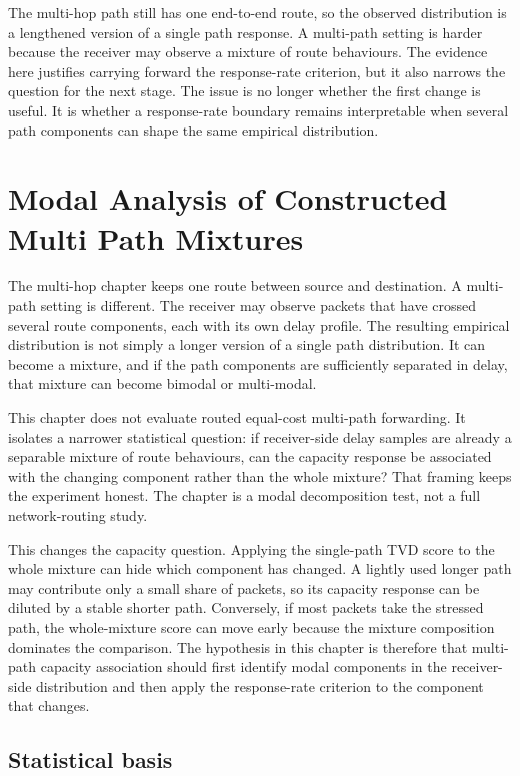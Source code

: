 \documentclass[a4paper,11pt]{report}
\begin{document}
The multi-hop path still has one end-to-end route, so the observed distribution is a lengthened version of a single path response. A multi-path setting is harder because the receiver may observe a mixture of route behaviours. The evidence here justifies carrying forward the response-rate criterion, but it also narrows the question for the next stage. The issue is no longer whether the first change is useful. It is whether a response-rate boundary remains interpretable when several path components can shape the same empirical distribution.

\chapter{Modal Analysis of Constructed Multi Path Mixtures}
\label{sec:eval-multi-path}

The multi-hop chapter keeps one route between source and destination. A multi-path setting is different. The receiver may observe packets that have crossed several route components, each with its own delay profile. The resulting empirical distribution is not simply a longer version of a single path distribution. It can become a mixture, and if the path components are sufficiently separated in delay, that mixture can become bimodal or multi-modal.

This chapter does not evaluate routed equal-cost multi-path forwarding. It isolates a narrower statistical question: if receiver-side delay samples are already a separable mixture of route behaviours, can the capacity response be associated with the changing component rather than the whole mixture? That framing keeps the experiment honest. The chapter is a modal decomposition test, not a full network-routing study.

This changes the capacity question. Applying the single-path TVD score to the whole mixture can hide which component has changed. A lightly used longer path may contribute only a small share of packets, so its capacity response can be diluted by a stable shorter path. Conversely, if most packets take the stressed path, the whole-mixture score can move early because the mixture composition dominates the comparison. The hypothesis in this chapter is therefore that multi-path capacity association should first identify modal components in the receiver-side distribution and then apply the response-rate criterion to the component that changes.

\section{Statistical basis}
\end{document}
